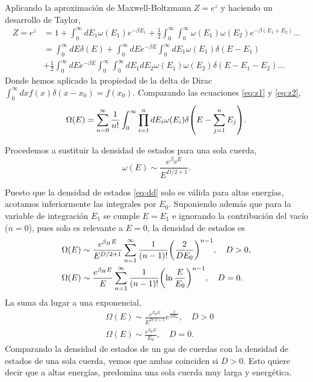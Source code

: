 Aplicando la aproximación de Maxwell-Boltzmann $Z=e^z$ y haciendo un desarrollo de Taylor,
\begin{equation}
  \begin{aligned}
      Z = e^z&= 1+ \int_0^\infty dE_1\omega(E_1)e^{-\beta E_1} +\frac 1 2 \int_0^\infty \int_0^\infty
      \omega(E_1)\omega(E_2)e^{-\beta(E_1+E_2)}\dots \\
      &=\int_0^\infty dE \delta(E) + \int_0^\infty dE e^{-\beta E}\int_0^\infty  dE_1\omega(E_1)\delta(E-E_1)\\
      &+\frac 1 2\int_0^\infty dE e^{-\beta E} \int_0^\infty\int_0^\infty dE_1 dE_2 \omega(E_1)\omega(E_2) \delta(E-E_1-E_2)\dots
  \end{aligned}
  \label{eq:z2}
\end{equation}
Donde hemos aplicado la propiedad de la delta de Dirac $\int_0^\infty dx f(x)\delta(x-x_0) = f(x_0)$.
Comparando las ecuaciones \ref{eq:z1} y \ref{eq:z2},
\begin{equation}
  \Omega(E)=\sum_{n=0}^\infty \frac{1}{n!}\int_0^\infty \prod_{i=1}^n dE_i \omega(E_i)\delta\qty(E-\sum_{j=1}^n E_j).
\end{equation}

Procedemos a sustituir la densidad de estados para una sola cuerda,
\begin{equation}
  \omega(E)\sim \frac{e^{\beta_H E}}{E^{D/2+1}}.
  \label{eq:dd}
\end{equation}

Puesto que la densidad de estados \ref{eq:dd} solo es válida para altas energías, acotamos inferiormente
las integrales por $E_0$.
Suponiendo además que para la variable de integración $E_1$ se cumple $E=E_1$ e ignorando
la contribución del vacío ($n=0$), pues solo es relevante a $E=0$, la densidad de estados es
\begin{equation}
  \begin{aligned}
    &\Omega(E) \sim \frac{e^{\beta_H E}}{E^{D/2+1}} \sum_{n=1}^\infty \frac{1}{(n-1)!}\qty(\frac{2}{DE_0})^{n-1},\quad D>0,\\
    &\Omega(E) \sim \frac{e^{\beta_H E}}{E} \sum_{n=1}^\infty \frac{1}{(n-1)!}\qty(\ln \frac{E}{E_0})^{n-1},\quad D=0.\\
  \end{aligned}
\end{equation}
La suma da lugar a una exponencial,
\begin{equation}
  \begin{aligned}
    &\Omega(E) \sim \frac{e^{\beta_H E}}{E^{D/2+1}}e^{\frac{2}{DE_0}}, \quad D>0\\
    &\Omega(E) \sim \frac{e^{\beta_H E}}{E_0}, \quad D=0.
  \end{aligned}
\end{equation}
Comparando la densidad de estados de un gas de cuerdas con la densidad de estados de una sola cuerda, vemos que 
ambas coinciden si $D>0$.
Esto quiere decir que a altas energías, predomina una sola cuerda muy larga y energética.

